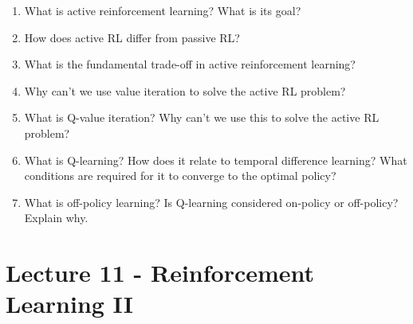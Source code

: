 \documentclass[]{article}
\begin{document}
\begin{enumerate}
\item What is active reinforcement learning? What is its goal? 
\item How does active RL differ from passive RL?
\item What is the fundamental trade-off in active reinforcement learning?

\item Why can't we use value iteration to solve the active RL problem?
\item What is Q-value iteration? Why can't we use this to solve the active RL problem?
\item What is Q-learning? How does it relate to temporal difference learning? What conditions are required for it to converge to the optimal policy?
\item What is off-policy learning? Is Q-learning considered on-policy or off-policy? Explain why.\\
\end{enumerate}

\section*{Lecture 11 - Reinforcement Learning II}
\end{document}
